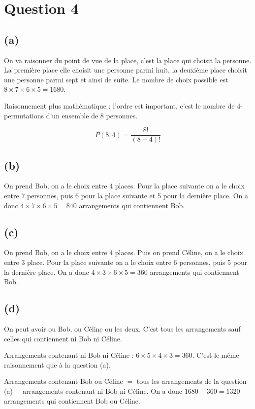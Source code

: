 \section*{Question 4}
\setlength\parindent{17pt}
\subsection*{(a)}
On va raisonner du point de vue de la place, c’est la place qui choisit la personne. La première place elle choisit une personne parmi huit, la deuxième place choisit une personne parmi sept et ainsi de suite. Le nombre de choix possible est $ 8 \times 7 \times 6 \times 5 = 1680$.

Raisonnement plus mathématique : l’ordre est important, c’est le nombre de 4-permutations d’un ensemble de 8 personnes.

\[P(8,4) = \frac{8!}{(8-4)!}\]

\subsection*{(b)}
On prend Bob, on a le choix entre 4 places. Pour la place suivante on a le choix entre 7 personnes, puis 6 pour la place suivante et 5 pour la dernière place. On a donc $ 4 \times 7 \times 6 \times 5 = 840$ arrangements qui contiennent Bob.

\subsection*{(c)}
On prend Bob, on a le choix entre 4 places. Puis on prend Céline, on a le choix entre 3 place. Pour la place suivante on a le choix entre 6 personnes, puis 5 pour la dernière place. On a donc $ 4 \times 3 \times 6 \times 5 = 360$ arrangements qui contiennent Bob.

\subsection*{(d)}
On peut avoir ou Bob, ou Céline ou les deux. C’est tous les arrangements sauf celles qui contiennent ni Bob ni Céline.

Arrangements contenant ni Bob ni Céline : $ 6 \times 5 \times 4 \times 3 = 360$. C’est le même raisonnement que à la question (a).

Arrangements contenant Bob ou Céline $=$ tous les arrangements de la question (a) $-$  arrangements contenant ni Bob ni Céline. On a donc $1680-360 = 1320 $ arrangements qui contiennent Bob ou Céline.
